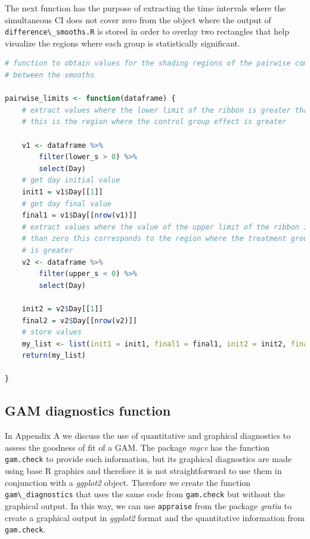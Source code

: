 \documentclass[
]{article}
\newcommand{\passthrough}[1]{#1}
\begin{document}
The next function has the purpose of extracting the time intervals where the simultaneous CI does not cover zero from the object where the output of \passthrough{\lstinline!difference\_smooths.R!} is stored in order to overlay two rectangles that help visualize the regions where each group is statistically significant.

\begin{lstlisting}[language=R]
# function to obtain values for the shading regions of the pairwise comparison
# between the smooths

pairwise_limits <- function(dataframe) {
    # extract values where the lower limit of the ribbon is greater than zero
    # this is the region where the control group effect is greater

    v1 <- dataframe %>%
        filter(lower_s > 0) %>%
        select(Day)
    # get day initial value
    init1 = v1$Day[[1]]
    # get day final value
    final1 = v1$Day[[nrow(v1)]]
    # extract values where the value of the upper limit of the ribbon is lower
    # than zero this corresponds to the region where the treatment group effect
    # is greater
    v2 <- dataframe %>%
        filter(upper_s < 0) %>%
        select(Day)

    init2 = v2$Day[[1]]
    final2 = v2$Day[[nrow(v2)]]
    # store values
    my_list <- list(init1 = init1, final1 = final1, init2 = init2, final2 = final2)
    return(my_list)

}
\end{lstlisting}

\hypertarget{gam-diagnostics-function}{%
\subsection{GAM diagnostics function}\label{gam-diagnostics-function}}

In Appendix A we discuss the use of quantitative and graphical diagnostics to assess the goodness of fit of a GAM. The package \emph{mgcv} has the function \passthrough{\lstinline!gam.check!} to provide such information, but its graphical diagnostics are made using base R graphics and therefore it is not straightforward to use them in conjunction with a \emph{ggplot2} object. Therefore we create the function \passthrough{\lstinline!gam\_diagnostics!} that uses the same code from \passthrough{\lstinline!gam.check!} but without the graphical output. In this way, we can use \passthrough{\lstinline!appraise!} from the package \emph{gratia} to create a graphical output in \emph{ggplot2} format and the quantitative information from \passthrough{\lstinline!gam.check!}.
\end{document}
